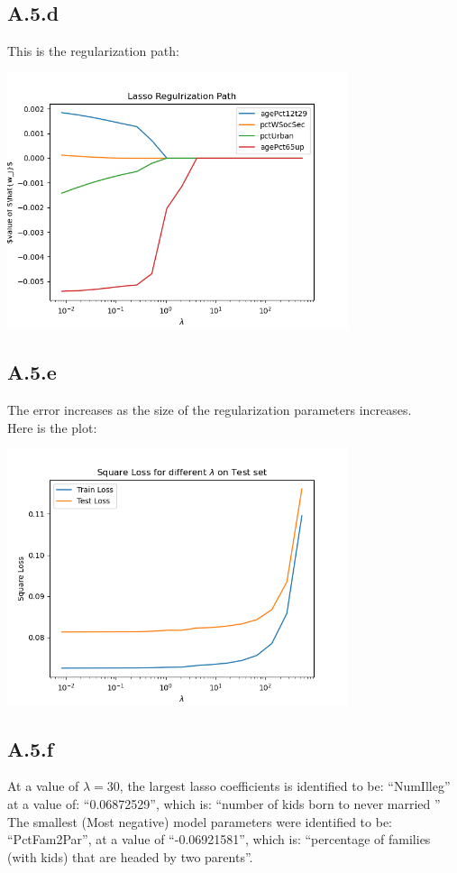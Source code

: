 \documentclass[]{article}
\begin{document}
    \subsection*{A.5.d}
        This is the regularization path: 
        \begin{center}
            \includegraphics[width=10cm]{A5d-plot.png}
        \end{center}
    \subsection*{A.5.e}
        The error increases as the size of the regularization parameters increases. 
        \\
        Here is the plot: 
        \begin{center}
            \includegraphics[width=10cm]{A5e-plot.png}
        \end{center}
    \subsection*{A.5.f}
        At a value of $\lambda = 30$, the largest lasso coefficients is identified to be: ``NumIlleg'' at a value of:  ``0.06872529'', which is: ``number of kids born to never married ''
        \\
        The smallest (Most negative) model parameters were identified to be: ``PctFam2Par'', at a value of  ``-0.06921581'', which is: ``percentage of families (with kids) that are headed by two parents''. 
\end{document}
